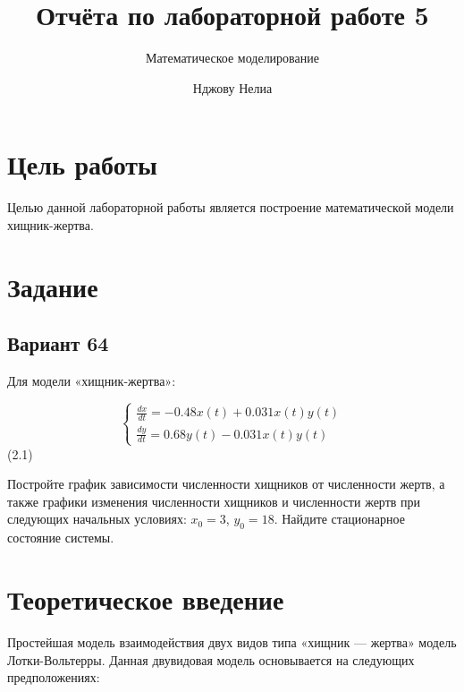 \documentclass[
  12pt,
  a4paper,
  DIV=11,
  numbers=noendperiod]{scrreprt}
\title{Отчёта по лабораторной работе 5}
\subtitle{Математическое моделирование}
\author{Нджову Нелиа}
\date{}
\renewcommand*\contentsname{Содержание}
\newcommand\contentsname{Содержание}
\begin{document}
\maketitle

\renewcommand*\contentsname{Содержание}
{
\setcounter{tocdepth}{1}
\tableofcontents
}
\listoffigures
\listoftables
{}
\chapter{Цель
работы}\label{ux446ux435ux43bux44c-ux440ux430ux431ux43eux442ux44b}

Целью данной лабораторной работы является построение математической
модели хищник-жертва.

\chapter{Задание}\label{ux437ux430ux434ux430ux43dux438ux435}

\section{Вариант 64}\label{ux432ux430ux440ux438ux430ux43dux442-64}

Для модели «хищник-жертва»:

\[
\begin{cases}
\frac{dx}{dt} = -0.48x(t) + 0.031x(t)y(t)\\
\frac{dy}{dt} = 0.68y(t) - 0.031x(t)y(t)
\end{cases}
\](2.1)

Постройте график зависимости численности хищников от численности жертв,
а также графики изменения численности хищников и численности жертв при
следующих начальных условиях: \(x_0 = 3\), \(y_0 = 18\). Найдите
стационарное состояние системы.

\chapter{Теоретическое
введение}\label{ux442ux435ux43eux440ux435ux442ux438ux447ux435ux441ux43aux43eux435-ux432ux432ux435ux434ux435ux43dux438ux435}

Простейшая модель взаимодействия двух видов типа «хищник --- жертва»
модель Лотки-Вольтерры. Данная двувидовая модель основывается на
следующих предположениях:
\end{document}
